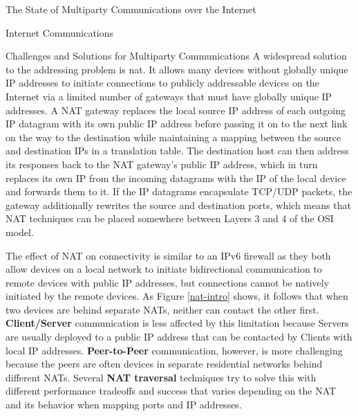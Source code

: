\begin{frame}[fragile]{The State of Multiparty Communications over the Internet}
\begin{block}{Internet Communications}
\begin{block}{Challenges and Solutions for Multiparty Communications}
A widespread solution to the addressing problem is \gls{nat}. It allows many devices without globally unique IP addresses to initiate connections to publicly addressable devices on the Internet via a limited number of gateways that must have globally unique IP addresses. A NAT gateway replaces the local source IP address of each outgoing IP datagram with its own public IP address before passing it on to the next link on the way to the destination while maintaining a mapping between the source and destination IPs in a translation table. The destination host can then address its responses back to the NAT gateway's public IP address, which in turn replaces its own IP from the incoming datagrams with the IP of the local device and forwards them to it. If the IP datagrams encapsulate TCP/UDP packets, the gateway additionally rewrites the source and destination ports, which means that NAT techniques can be placed somewhere between Layers 3 and 4 of the OSI model.

The effect of NAT on connectivity is similar to an IPv6 firewall as they both allow devices on a local network to initiate bidirectional communication to remote devices with public IP addresses, but connections cannot be natively initiated by the remote devices. As Figure \ref{nat-intro} shows, it follows that when two devices are behind separate NATs, neither can contact the other first. \textbf{Client/Server} communication is less affected by this limitation because Servers are usually deployed to a public IP address that can be contacted by Clients with local IP addresses. \textbf{Peer-to-Peer} communication, however, is more challenging because the peers are often devices in separate residential networks behind different NATs. Several \textbf{NAT traversal} techniques try to solve this with different performance tradeoffs and success that varies depending on the NAT \autocite{natBehaviorRFC} and its behavior when mapping ports and IP addresses. 


\end{block}
\end{block}
\end{frame}
